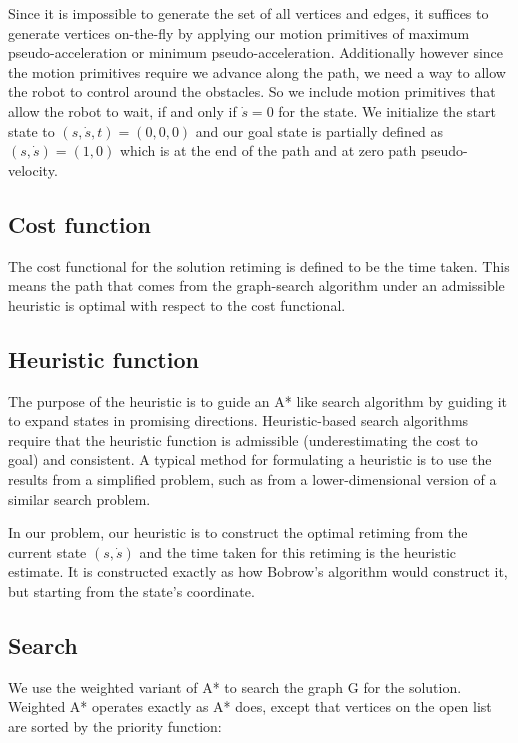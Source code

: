 \documentclass[letterpaper,12pt]{article} %
\begin{document}
Since it is impossible to generate the set of all vertices and edges, it suffices to generate vertices on-the-fly by applying our motion primitives of maximum pseudo-acceleration or minimum pseudo-acceleration. Additionally however since the motion primitives require we advance along the path, we need a way to allow the robot to control around the obstacles. So we include motion primitives that allow the robot to wait, if and only if $\dot{s} = 0$ for the state. We initialize the start state to $(s,\dot{s},t)=(0, 0, 0)$ and our goal state is partially defined as $(s,\dot{s})=(1, 0)$ which is at the end of the path and at zero path pseudo-velocity.

\subsection{Cost function}\label{subsec:cost}

The cost functional for the solution retiming is defined to be the time taken. This means the path that comes from the graph-search algorithm under an admissible heuristic is optimal with respect to the cost functional.

\subsection{Heuristic function}\label{subsec:heur}

The purpose of the heuristic is to guide an A* like search algorithm by guiding it to expand states in promising directions. Heuristic-based search algorithms require that the heuristic function is admissible (underestimating the cost to goal) and consistent. A typical method for formulating a heuristic is to use the results from a simplified problem, such as from a lower-dimensional version of a similar search problem.

In our problem, our heuristic is to construct the optimal retiming from the current state $(s, \dot{s})$ and the time taken for this retiming is the heuristic estimate. It is constructed exactly as how Bobrow's algorithm would construct it, but starting from the state's coordinate.

\subsection{Search}\label{subsec:search}

We use the weighted variant of A* to search the graph G for the solution. Weighted A* operates exactly as A* does, except that vertices on the open list are sorted by the priority function:
\end{document}
